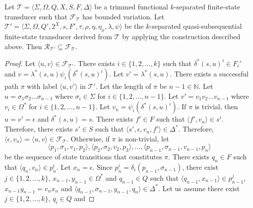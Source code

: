 \begin{lemma}\label{lem:quasisubseq_inclusion_left}
  Let $\mathcal{T} = \langle \Sigma, \Omega, Q, X, S, F, \Delta \rangle$ be a trimmed
  functional $k$-separated finite-state transducer such that
  $\mathcal{F}_\mathcal{T}$ has bounded variation.
  Let $\mathcal{T}' = \langle \Sigma, \Omega, Q', 2^X, s, F', \tau, \rho, \eta,
  \eta_x, \lambda, \psi \rangle$ be the $k$-separated quasi-subsequential
  finite-state transducer derived from $\mathcal{T}$ by applying the construction
  described above. Then $\mathcal{R}_{\mathcal{T}'} \subseteq
  \mathcal{F}_\mathcal{T}$.
\end{lemma}

\begin{proof}
  Let $\langle u, v \rangle \in \mathcal{F}_{\mathcal{T}'}$.
  There exists $i \in \{ 1, 2, \ldots, k \}$ such that $\delta^*(s, u)^i \in F_i'$
  and $v = \lambda^*(s, u) \psi_i(\delta^*(s, u)^i)$.
  Let $v' = \lambda^*(s, u)$.
  There exists a successful path $\pi$ with label $\langle u, v' \rangle$ in
  $\mathcal{T}'$.
  Let the length of $\pi$ be $n-1 \in \mathbb{N}$.
  Let $u = \sigma_1 \sigma_2 \ldots \sigma_{n-1}$ where $\sigma_i \in
  \Sigma$ for $i \in \{ 1, 2, \ldots, n-1 \}$.
  Let $v' = v_1 v_2 \ldots v_{n-1}$ where $v_i \in \Omega^*$ for $i \in \{ 1, 2,
  \ldots, n-1 \}$.
  Let $v_n = \psi_i(\delta^*(s, u)^i)$.
  If $\pi$ is trivial, then $u = v' = \epsilon$ and $\delta^*(s, u) = s$.
  There exists $f' \in F$ such that $\langle f', v_n \rangle \in s^i$.
  Therefore, there exists $s' \in S$ such that $\langle s', \epsilon, v_n, f' \rangle
  \in \Delta^*$.
  Therefore, $\langle \epsilon, v_n \rangle = \langle u, v \rangle \in
  \mathcal{F}_\mathcal{T}$.
  Otherwise, if $\pi$ is non-trivial, let
  \begin{equation*}
    \langle p_1, \sigma_1, v_1, p_2 \rangle, \langle p_2, \sigma_2, v_2,
    p_3 \rangle, \ldots, \langle p_{n-1}, \sigma_{n-1}, v_{n-1}, p_n
    \rangle
  \end{equation*}
  be the sequence of state transitions that constitutes $\pi$.
  There exists $q_n \in F$ such that $\langle q_n, v_n \rangle \in p_n^i$.
  Let $x_n = \epsilon$.
  Since $p_n^i = \delta_i(p_{n-1}, \sigma_{n-1})$, there exist $j \in \{ 1, 2,
  \ldots, k \}$, $x_{n-1}, y_{n-1} \in \Omega^*$ and $q_{n-1} \in Q$ such that
  $\langle q_{n-1}, x_{n-1} \rangle \in p_{n-1}^j$, $x_{n-1} y_{n-1} = v_n x_n$ and
  $\langle q_{n-1}, \sigma_{n-1}, y_{n-1}, q_n \rangle \in \Delta^*$.
  Let us assume there exist $j \in \{ 1, 2, \ldots, k \}$, $q_i \in Q$ and

\end{proof}
